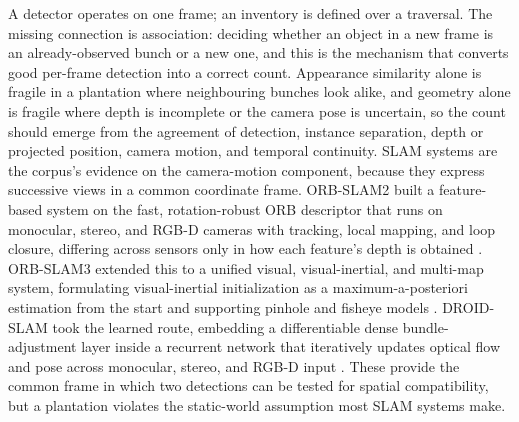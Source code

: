 A detector operates on one frame; an inventory is defined over a traversal. The missing connection is association: deciding whether an object in a new frame is an already-observed bunch or a new one, and this is the mechanism that converts good per-frame detection into a correct count. Appearance similarity alone is fragile in a plantation where neighbouring bunches look alike, and geometry alone is fragile where depth is incomplete or the camera pose is uncertain, so the count should emerge from the agreement of detection, instance separation, depth or projected position, camera motion, and temporal continuity. SLAM systems are the corpus's evidence on the camera-motion component, because they express successive views in a common coordinate frame. ORB-SLAM2 built a feature-based system on the fast, rotation-robust ORB descriptor that runs on monocular, stereo, and RGB-D cameras with tracking, local mapping, and loop closure, differing across sensors only in how each feature's depth is obtained \cite{murartal2017orbslam2}. ORB-SLAM3 extended this to a unified visual, visual-inertial, and multi-map system, formulating visual-inertial initialization as a maximum-a-posteriori estimation from the start and supporting pinhole and fisheye models \cite{campos2021orbslam3}. DROID-SLAM took the learned route, embedding a differentiable dense bundle-adjustment layer inside a recurrent network that iteratively updates optical flow and pose across monocular, stereo, and RGB-D input \cite{teed2021droidslam}. These provide the common frame in which two detections can be tested for spatial compatibility, but a plantation violates the static-world assumption most SLAM systems make.

